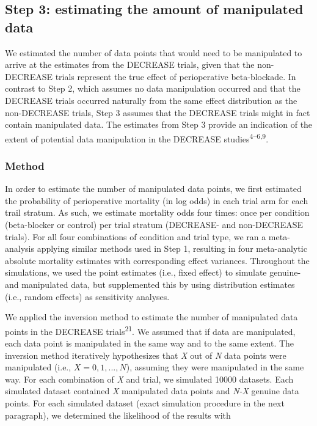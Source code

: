 \documentclass[]{article}
\begin{document}
\subsection{Step 3: estimating the amount of manipulated
data}\label{step-3-estimating-the-amount-of-manipulated-data}

We estimated the number of data points that would need to be manipulated
to arrive at the estimates from the DECREASE trials, given that the
non-DECREASE trials represent the true effect of perioperative
beta-blockade. In contrast to Step 2, which assumes no data manipulation
occurred and that the DECREASE trials occurred naturally from the same
effect distribution as the non-DECREASE trials, Step 3 assumes that the
DECREASE trials might in fact contain manipulated data. The estimates
from Step 3 provide an indication of the extent of potential data
manipulation in the DECREASE studies\textsuperscript{4--6,9}.

\subsubsection{Method}\label{method-1}

In order to estimate the number of manipulated data points, we first
estimated the probability of perioperative mortality (in log odds) in
each trial arm for each trail stratum. As such, we estimate mortality
odds four times: once per condition (beta-blocker or control) per trial
stratum (DECREASE- and non-DECREASE trials). For all four combinations
of condition and trial type, we ran a meta-analysis applying similar
methods used in Step 1, resulting in four meta-analytic absolute
mortality estimates with corresponding effect variances. Throughout the
simulations, we used the point estimates (i.e., fixed effect) to
simulate genuine- and manipulated data, but supplemented this by using
distribution estimates (i.e., random effects) as sensitivity analyses.

We applied the inversion method to estimate the number of manipulated
data points in the DECREASE trials\textsuperscript{21}. We assumed that
if data are manipulated, each data point is manipulated in the same way
and to the same extent. The inversion method iteratively hypothesizes
that \emph{X} out of \emph{N} data points were manipulated (i.e.,
\(X={0, 1, ..., N}\)), assuming they were manipulated in the same way.
For each combination of \emph{X} and trial, we simulated 10000 datasets.
Each simulated dataset contained \emph{X} manipulated data points and
\emph{N-X} genuine data points. For each simulated dataset (exact
simulation procedure in the next paragraph), we determined the
likelihood of the results with
\end{document}
